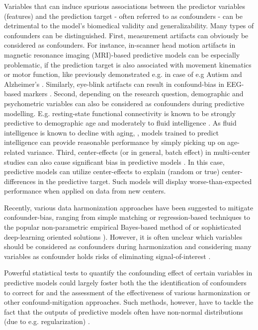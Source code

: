 \documentclass{article}
\begin{document}
Variables that can induce spurious associations between the predictor variables (features) and the prediction target - often referred to as confounders - can be detrimental to the model's biomedical validity and generalizability. Many types of confounders can be distinguished.
First, measurement artifacts can obviously be considered as confounders. For instance, in-scanner head motion artifacts in magnetic resonance imaging (MRI)-based predictive models can be especially problematic, if the prediction target is also associated with movement kinematics or motor function, like previously demonstrated e.g. in case of e.g Autism \citep{spisak2014voxel, spisak2019optimal} and Alzheimer's \citep{rao2017predictive}. Similarly, eye-blink artifacts can result in confound-bias in EEG-based markers \citep{eldridge2014robust}.
Second, depending on the research question, demographic and psychometric variables can also be considered as confounders during predictive modelling. E.g. resting-state functional connectivity is known to be strongly predictive to  demographic age \citep{wang2012decoding, dukart2011age} and moderately to fluid intelligence \citep{he2020deep, cole2012global}. As fluid intelligence is known to decline with aging, \citep{kievit2018neural}, models trained to predict intelligence can provide reasonable performance by simply picking up on age-related variance. 
Third, center-effects (or in general, batch effect) in multi-center studies can also cause significant bias in predictive models \citep{leek2010tackling, da2020performance}. In this case, predictive models can utilize center-effects to explain (random or true) center-differences in the predictive target. Such models will display worse-than-expected performance when applied on data from new centers.

Recently, various data harmonization approaches have been suggested to mitigate confounder-bias, ranging from simple matching \citep{rao2017predictive} or regression-based techniques \citep{rao2017predictive, dukart2011age, spisak2014voxel, abdulkadir2014reduction} to the popular non-parametric empirical Bayes-based method of \cite{johnson2007adjusting} or sophisticated deep-learning oriented solutions \citep{zhao2020training, hognon2019standardization}). However, it is often unclear which variables should be considered as confounders during harmonization and considering many variables as confounder holds risks of eliminating signal-of-interest \citep{wachinger2021detect}.

Powerful statistical tests to quantify the confounding effect of certain variables in predictive models could largely foster both the the identification of confounders to correct for and the assessment of the effectiveness of various harmonization or other confound-mitigation approaches. Such methods, however, have to tackle the fact that the outputs of predictive models often have non-normal distributions (due to e.g. regularization) \citep{garcia2009study, kristensen2017whole}.
\end{document}
